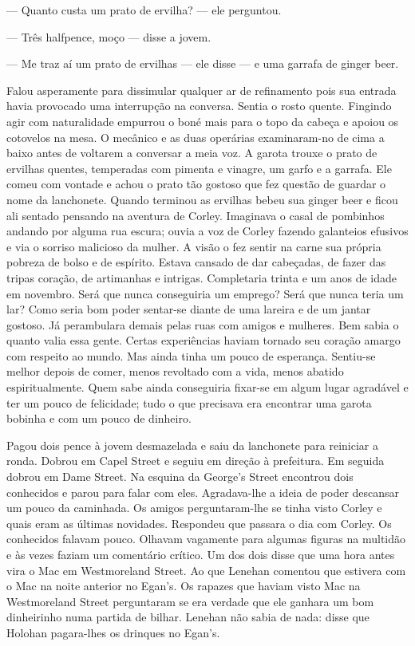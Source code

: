 --- Quanto custa um prato de ervilha? --- ele perguntou.

--- Três halfpence, moço --- disse a jovem.

--- Me traz aí um prato de ervilhas --- ele disse --- e uma garrafa de
ginger beer.

Falou asperamente para dissimular qualquer ar de refinamento pois
sua entrada havia provocado uma interrupção na conversa. Sentia o
rosto quente. Fingindo agir com naturalidade empurrou o boné mais
para o topo da cabeça e apoiou os cotovelos na mesa. O mecânico e as
duas operárias examinaram-no de cima a baixo antes de voltarem a
conversar a meia voz. A garota trouxe o prato de ervilhas quentes,
temperadas com pimenta e vinagre, um garfo e a garrafa. Ele comeu com
vontade e achou o prato tão gostoso que fez questão de guardar o nome
da lanchonete. Quando terminou as ervilhas bebeu sua ginger beer e
ficou ali sentado pensando na aventura de Corley. Imaginava o casal de
pombinhos andando por alguma rua escura; ouvia a voz de Corley
fazendo galanteios efusivos e via o sorriso malicioso da mulher. A
visão o fez sentir na carne sua própria pobreza de bolso e de
espírito. Estava cansado de dar cabeçadas, de fazer das tripas
coração, de artimanhas e intrigas. Completaria trinta e um anos de
idade em novembro. Será que nunca conseguiria um emprego? Será que
nunca teria um lar? Como seria bom poder sentar-se diante de uma
lareira e de um jantar gostoso. Já perambulara demais pelas ruas com
amigos e mulheres. Bem sabia o quanto valia essa gente. Certas
experiências haviam tornado seu coração amargo com respeito ao mundo.
Mas ainda tinha um pouco de esperança. Sentiu-se melhor depois de
comer, menos revoltado com a vida, menos abatido espiritualmente. Quem
sabe ainda conseguiria fixar-se em algum lugar agradável e ter um
pouco de felicidade; tudo o que precisava era encontrar uma garota
bobinha e com um pouco de dinheiro.

Pagou dois pence à jovem desmazelada e saiu da lanchonete para
reiniciar a ronda. Dobrou em Capel Street e seguiu em direção à
prefeitura. Em seguida dobrou em Dame Street. Na esquina da George's
Street encontrou dois conhecidos e parou para falar com eles.
Agradava-lhe a ideia de poder descansar um pouco da caminhada. Os
amigos perguntaram-lhe se tinha visto Corley e quais eram as últimas
novidades. Respondeu que passara o dia com Corley. Os conhecidos
falavam pouco. Olhavam
vagamente para algumas figuras na multidão e às vezes faziam um comentário
crítico. Um dos dois disse que uma hora antes vira o Mac em
Westmoreland Street. Ao que Lenehan comentou que estivera com o Mac na
noite anterior no Egan's. Os rapazes que haviam visto Mac na
Westmoreland Street perguntaram se era verdade que ele ganhara um bom
dinheirinho numa partida de bilhar. Lenehan não sabia de nada: disse
que Holohan pagara-lhes os drinques no Egan's.

